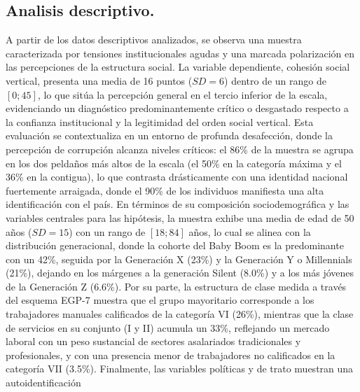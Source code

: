 \documentclass[
  spanish,
  a4paper,
  oneside]{scrbook}
\begin{document}
\subsection{Analisis descriptivo.}\label{analisis-descriptivo.}

\begin{table}

\caption{\label{tbl-descriptivos}Tabla 1. Estadísticos descriptivos (N=
)}

\centering{

}

\end{table}%

A partir de los datos descriptivos analizados, se observa una muestra
caracterizada por tensiones institucionales agudas y una marcada
polarización en las percepciones de la estructura social. La variable
dependiente, cohesión social vertical, presenta una media de 16 puntos
(\(SD = 6\)) dentro de un rango de \([0; 45]\), lo que sitúa la
percepción general en el tercio inferior de la escala, evidenciando un
diagnóstico predominantemente crítico o desgastado respecto a la
confianza institucional y la legitimidad del orden social vertical. Esta
evaluación se contextualiza en un entorno de profunda desafección, donde
la percepción de corrupción alcanza niveles críticos: el 86\% de la
muestra se agrupa en los dos peldaños más altos de la escala (el 50\% en
la categoría máxima y el 36\% en la contigua), lo que contrasta
drásticamente con una identidad nacional fuertemente arraigada, donde el
90\% de los individuos manifiesta una alta identificación con el país.
En términos de su composición sociodemográfica y las variables centrales
para las hipótesis, la muestra exhibe una media de edad de 50 años
(\(SD = 15\)) con un rango de \([18; 84]\) años, lo cual se alinea con
la distribución generacional, donde la cohorte del Baby Boom es la
predominante con un 42\%, seguida por la Generación X (23\%) y la
Generación Y o Millennials (21\%), dejando en los márgenes a la
generación Silent (8.0\%) y a los más jóvenes de la Generación Z
(6.6\%). Por su parte, la estructura de clase medida a través del
esquema EGP-7 muestra que el grupo mayoritario corresponde a los
trabajadores manuales calificados de la categoría VI (26\%), mientras
que la clase de servicios en su conjunto (I y II) acumula un 33\%,
reflejando un mercado laboral con un peso sustancial de sectores
asalariados tradicionales y profesionales, y con una presencia menor de
trabajadores no calificados en la categoría VII (3.5\%). Finalmente, las
variables políticas y de trato muestran una autoidentificación
\end{document}
